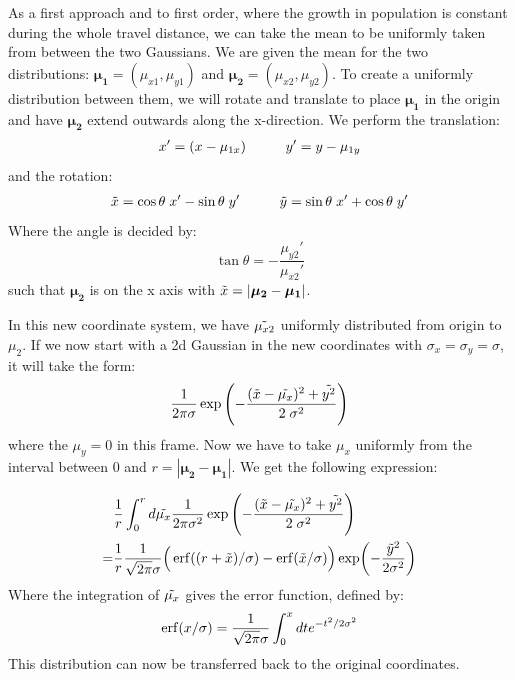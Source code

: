 As a first approach and to first order, where the growth in population is constant during the whole travel distance, we can take the mean to be uniformly taken from between the two Gaussians. We are given the mean for the two distributions: $\boldsymbol{\mu_1} = (\mu_{x1}, \mu_{y1})$ and $\boldsymbol{\mu_2} = (\mu_{x2}, \mu_{y2})$. To create a uniformly distribution between them, we will rotate and translate to place $\boldsymbol{\mu_1}$ in the origin and have $\boldsymbol{\mu_2}$ extend outwards along the x-direction. We perform the translation:
\begin{align*}
    x' = (x - \mu_{1x}) \hspace{1 cm} y' = y - \mu_{1y}
\end{align*}
and the rotation:
\begin{align*}
    \Tilde{x} = \cos\theta \; x' - \sin\theta \; y' \hspace{1cm} \Tilde{y} =  \sin\theta \; x' + \cos\theta \; y' 
\end{align*}
Where the angle is decided by:
\begin{equation}
    \tan \theta = - \frac{\mu_{y2}'}{\mu_{x2}'} 
\end{equation}
such that  $\boldsymbol{\mu_{2}}$ is on the x axis with $\Tilde{x} = |\boldsymbol{\mu_{2}} - \boldsymbol{\mu_{1}}|$.

In this new coordinate system, we have $\Tilde{\mu_{x2}}$ uniformly distributed from origin to $\mu_2$. If we now start with a 2d Gaussian in the new coordinates with $\sigma_x = \sigma_y = \sigma$, it will take the form:
\begin{equation}
    \frac{1}{2 \pi \sigma} \exp \left(- \frac{(\Tilde{x} - \Tilde{\mu_x})^2 + \Tilde{y^2}}{2 \; \sigma^2} \right)
\end{equation}
where the $\mu_y = 0$ in this frame. Now we have to take $\mu_x$ uniformly from the interval between $0$ and $r = |\boldsymbol{\mu_{2}} - \boldsymbol{\mu_{1}}|$. We get the following expression:

\begin{align}
    &\frac{1}{r} \int_0^r d\Tilde{\mu_x} \frac{1}{2 \pi \sigma^2} \exp \left(- \frac{(\Tilde{x} - \Tilde{\mu_x})^2 + \Tilde{y^2}}{2 \; \sigma^2} \right) \\
    = &\frac{1}{r}\frac{1}{\sqrt{2 \pi} \sigma} \Big(\erf((r + \Tilde{x}) / \sigma) - \erf(\Tilde{x} / \sigma)\Big) \exp(-\frac{\Tilde{y}^2}{2 \sigma^2})
\end{align}
Where the integration of $\Tilde{\mu_x}$ gives the error function, defined by: 
\begin{equation}
    \erf(x/\sigma) = \frac{1}{\sqrt{2 \pi }\sigma} \int_0^x dt e^{-t^2/2\sigma^2}
\end{equation}
This distribution can now be transferred back to the original coordinates. 

